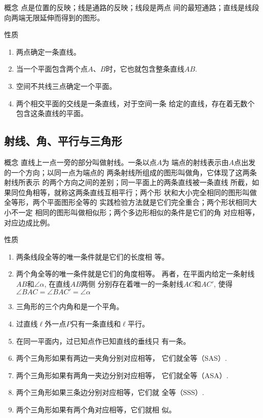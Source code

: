 \begin{blk}
	{概念} 点是位置的反映；线是通路的反映；线段是两点
间的最短通路；直线是线段向两端无限延伸而得到的图形。
\end{blk}

\begin{blk}
	{性质}
\begin{enumerate}
	\item 两点确定一条直线。
	\item 当一个平面包含两个点$A$、$B$时，它也就包含整条直线$AB$.
	\item 空间不共线三点确定一个平面。
	\item 两个相交平面的交线是一条直线，对于空间一条
	给定的直线，存在着无数个包含这条直线的平面。
\end{enumerate}
\end{blk}

\subsection*{射线、角、平行与三角形}

\begin{blk}
	{概念} 直线上一点一旁的部分叫做射线。一条以点$A$为
端点的射线表示由$A$点出发的一个方向；以同一点为端点的
两条射线所组成的图形叫做角，它体现了这两条射线所表示
的两个方向之间的差别；同一平面上的两条直线被一条直线
所截，如果同位角相等，就称这两条直线互相平行；两个形
状和大小完全相同的图形叫做全等形，两个平面图形全等的
实践检验方法就是它们完全重合；两个形状相同大小不一定
相同的图形叫做相似形；两个多边形相似的条件是它们的角
对应相等，对应边成比例。
\end{blk}

\begin{blk}{性质}
\begin{enumerate}
	\item 两条线段全等的唯一条件就是它们的长度相
	等。
	\item 两个角全等的唯一条件就是它们的角度相等。
	再者，在平面内给定一条射线$AB$和$\angle \alpha$, 在直线$AB$两侧
	分别存在着唯一的一条射线$AC$和$AC'$, 使得$\angle BAC=
	\angle BAC'=\angle\alpha$
	\item 三角形的三个内角和是一个平角。
	\item 过直线$\ell$外一点$P$只有一条直线和$\ell$平行。
	\item 在同一平面内，过已知点作已知直线的垂线只
	有一条。
	\item 两个三角形如果有两边一夹角分别对应相等，
	它们就全等（SAS）.
	\item 两个三角形如果有两角一夹边分别对应相等，
	它们就全等（ASA）.
	\item 两个三角形如果三条边分别对应相等，它们就
	全等（SSS）.
	\item 两个三角形如果有两个角对应相等，它们就相
	似。
	\end{enumerate}
\end{blk}

